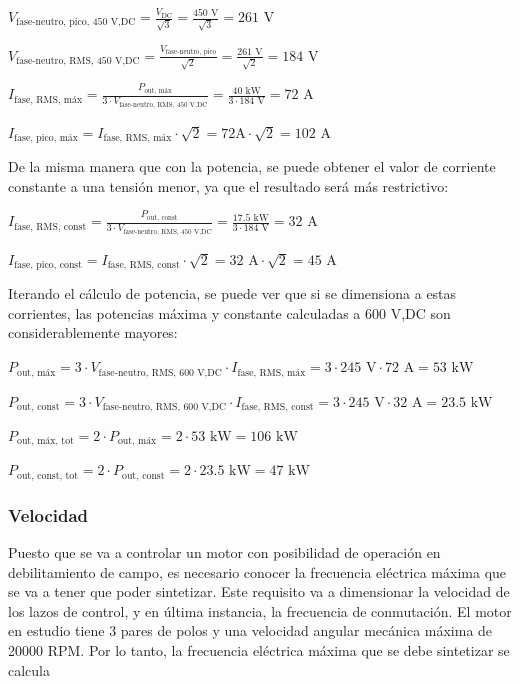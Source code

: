 \(V_{\text{fase-neutro, pico, 450 V,DC}} = \frac{V_{\text{DC}}}{\sqrt{3}} = \frac{450 \text{ V}}{\sqrt{3}} = 261 \text{ V}\)

\(V_{\text{fase-neutro, RMS, 450 V,DC}} = \frac{V_{\text{fase-neutro, pico}}}{\sqrt{2}} = \frac{261 \text{ V}}{\sqrt{2}} = 184 \text{ V}\)


\(I_{\text{fase, RMS, máx}} = \frac{P_{\text{out, máx}}}{3\cdot V_{\text{fase-neutro, RMS, 450 V,DC}}} = \frac{40 \text{ kW}}{3\cdot184 \text{ V}} = 72 \text{ A}\)

\(I_{\text{fase, pico, máx}} = I_{\text{fase, RMS, máx}}\cdot\sqrt{2} = 72\text{A} \cdot\sqrt{2} = 102 \text{ A}\)

De la misma manera que con la potencia, se puede obtener el valor de corriente constante a una tensión menor, ya que el resultado será más restrictivo:

\(I_{\text{fase, RMS, const}} = \frac{P_{\text{out, const}}}{3\cdot V_{\text{fase-neutro, RMS, 450 V,DC}}} = \frac{17.5 \text{ kW}}{3\cdot184 \text{ V}} = 32 \text{ A}\)

\(I_{\text{fase, pico, const}} = I_{\text{fase, RMS, const}}\cdot\sqrt{2} = 32 \text{ A}\cdot\sqrt{2} = 45 \text{ A}\)


Iterando el cálculo de potencia, se puede ver que si se dimensiona a estas corrientes, las potencias máxima y constante calculadas a 600 V,DC son considerablemente mayores:

\(P_{\text{out, máx}} = 3\cdot V_{\text{fase-neutro, RMS, 600 V,DC}}\cdot I_{\text{fase, RMS, máx}} = 3\cdot245 \text{ V}\cdot 72 \text{ A} = 53 \text{ kW}\)

\(P_{\text{out, const}} = 3\cdot V_{\text{fase-neutro, RMS, 600 V,DC}}\cdot I_{\text{fase, RMS, const}} = 3\cdot245 \text{ V}\cdot 32 \text{ A} = 23.5 \text{ kW}\)

\(P_{\text{out, máx, tot}} = 2\cdot P_{\text{out, máx}} = 2\cdot53 \text{ kW} = 106 \text{ kW}\)

\(P_{\text{out, const, tot}} = 2\cdot P_{\text{out, const}} = 2\cdot23.5 \text{ kW} = 47 \text{ kW}\)


\subsubsection{Velocidad}
Puesto que se va a controlar un motor con posibilidad de operación en debilitamiento de campo, es necesario conocer la frecuencia eléctrica máxima que se va a tener que poder sintetizar. Este requisito va a dimensionar la velocidad de los lazos de control, y en última instancia, la frecuencia de conmutación. El motor en estudio tiene 3 pares de polos y una velocidad angular mecánica máxima de 20000 RPM. Por lo tanto, la frecuencia eléctrica máxima que se debe sintetizar se calcula

